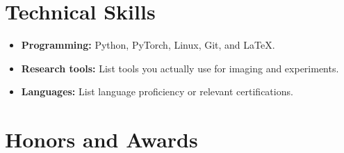 \documentclass{resume}
\begin{document}
\section{Technical Skills}
\begin{itemize}
\item \textbf{Programming:} Python, PyTorch, Linux, Git, and LaTeX.
\item \textbf{Research tools:} List tools you actually use for imaging and experiments.
\item \textbf{Languages:} List language proficiency or relevant certifications.
\end{itemize}
\section{Honors and Awards}
\end{document}
